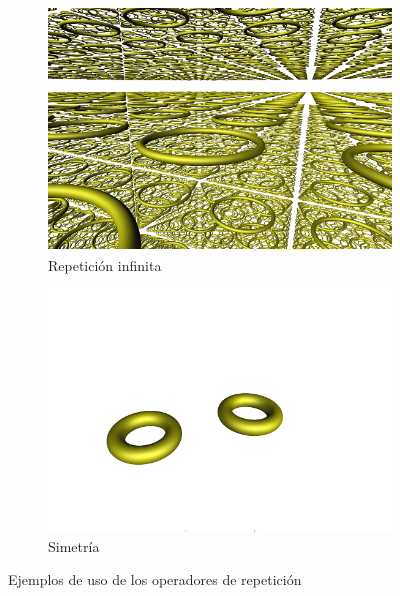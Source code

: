 \begin{figure}[ht!]
    \centering
    \begin{subfigure}[b]{0.48\textwidth}
        \centering
        \includegraphics[width=\textwidth]{Plantilla-TFG-master/img/rep.png}
        \caption{Repetición infinita}
    \end{subfigure}
    \hfill
    \begin{subfigure}[b]{0.48\textwidth}
        \centering
        \includegraphics[width=\textwidth]{Plantilla-TFG-master/img/sym.png}
        \caption{Simetría}
    \end{subfigure}
    \hfill
        
    \caption{Ejemplos de uso de los operadores de repetición}
\end{figure}

